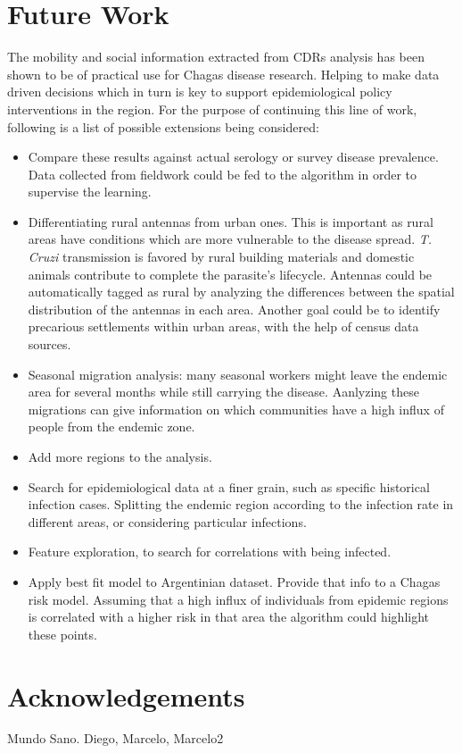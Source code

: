 \section{Future Work}

The mobility and social information extracted from CDRs analysis has been shown to be of practical use for Chagas disease research. Helping to make data driven decisions which in turn is key to support epidemiological policy interventions in the region. For the purpose of continuing this line of work, following is a list of possible extensions being considered:

\begin{itemize}
    \item Compare these results against actual serology or survey disease prevalence. Data collected from fieldwork could be fed to the algorithm in order to supervise the learning. 
    \item Differentiating rural antennas from urban ones. This is important as rural areas have conditions which are more vulnerable to the disease spread. \textit{T. Cruzi} transmission is favored by rural building materials and domestic animals contribute to complete the parasite's lifecycle. Antennas could be automatically tagged as rural by analyzing the differences between the spatial distribution of the antennas in each area. Another goal could be to identify precarious settlements within urban areas, with the help of census data sources.
    \item Seasonal migration analysis:  many seasonal workers might leave the endemic area for several months while still carrying the disease. Aanlyzing these migrations can give information on which communities have a high influx of people from the endemic zone.
    \item Add more regions to the analysis.
    \item Search for epidemiological data at a finer grain, such as specific historical infection cases. Splitting the endemic region according to the infection rate in different areas, or considering particular infections.
    \item Feature exploration, to search for correlations with being infected.
    \item Apply best fit model to Argentinian dataset. Provide that info to a Chagas risk model. Assuming that a high influx of individuals from epidemic regions is correlated with a higher risk in that area the algorithm could highlight these points. %
\end{itemize}

\section{Acknowledgements}
Mundo Sano. Diego, Marcelo, Marcelo2
